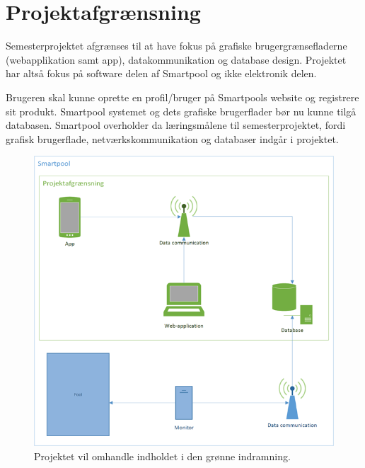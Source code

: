 \section{Projektafgrænsning}
Semesterprojektet afgrænses til at have fokus på grafiske brugergrænsefladerne (webapplikation samt app), datakommunikation og database design. Projektet har altså fokus på software delen af Smartpool og ikke elektronik delen.

Brugeren skal kunne oprette en profil/bruger på Smartpools website og registrere sit produkt. Smartpool systemet og dets grafiske brugerflader bør nu kunne tilgå databasen. Smartpool overholder da læringsmålene til semesterprojektet, fordi grafisk brugerflade, netværkskommunikation og databaser indgår i projektet.

\begin{figure}
	\centering
	\includegraphics[width=0.9\linewidth]{figs/afgraensning.png}
	\caption{Projektet vil omhandle indholdet i den grønne indramning.}
	\label{fig:afgraensning}
\end{figure}

\newpage